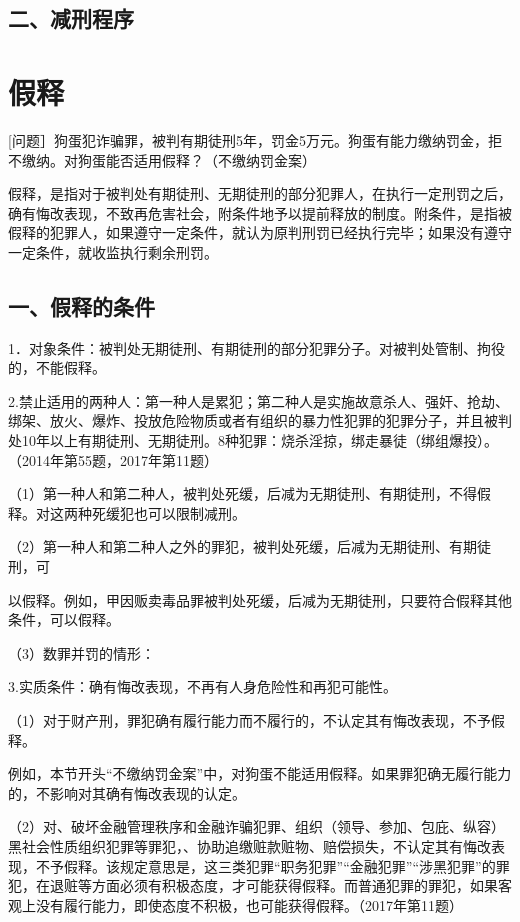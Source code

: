 \subsection*{二、减刑程序}


\section{假释}

[问题］狗蛋犯诈骗罪，被判有期徒刑5年，罚金5万元。狗蛋有能力缴纳罚金，拒不缴纳。对狗蛋能否适用假释？（不缴纳罚金案）

假释，是指对于被判处有期徒刑、无期徒刑的部分犯罪人，在执行一定刑罚之后，确有悔改表现，不致再危害社会，附条件地予以提前释放的制度。附条件，是指被假释的犯罪人，如果遵守一定条件，就认为原判刑罚已经执行完毕；如果没有遵守一定条件，就收监执行剩余刑罚。

\subsection*{一、假释的条件}

1．对象条件：被判处无期徒刑、有期徒刑的部分犯罪分子。对被判处管制、拘役的，不能假释。

2.禁止适用的两种人：第一种人是累犯；第二种人是实施故意杀人、强奸、抢劫、绑架、放火、爆炸、投放危险物质或者有组织的暴力性犯罪的犯罪分子，并且被判处10年以上有期徒刑、无期徒刑。8种犯罪：烧杀淫掠，绑走暴徒（绑组爆投）。（2014年第55题，2017年第11题）

（1）第一种人和第二种人，被判处死缓，后减为无期徒刑、有期徒刑，不得假释。对这两种死缓犯也可以限制减刑。

（2）第一种人和第二种人之外的罪犯，被判处死缓，后减为无期徒刑、有期徒刑，可

以假释。例如，甲因贩卖毒品罪被判处死缓，后减为无期徒刑，只要符合假释其他条件，可以假释。

（3）数罪并罚的情形：


3.实质条件：确有悔改表现，不再有人身危险性和再犯可能性。

（1）对于财产刑，罪犯确有履行能力而不履行的，不认定其有悔改表现，不予假释。

例如，本节开头“不缴纳罚金案”中，对狗蛋不能适用假释。如果罪犯确无履行能力的，不影响对其确有悔改表现的认定。

（2）对、破坏金融管理秩序和金融诈骗犯罪、组织（领导、参加、包庇、纵容）黑社会性质组织犯罪等罪犯，、协助追缴赃款赃物、赔偿损失，不认定其有悔改表现，不予假释。该规定意思是，这三类犯罪“职务犯罪”“金融犯罪”“涉黑犯罪”的罪犯，在退赃等方面必须有积极态度，才可能获得假释。而普通犯罪的罪犯，如果客观上没有履行能力，即使态度不积极，也可能获得假释。（2017年第11题）

